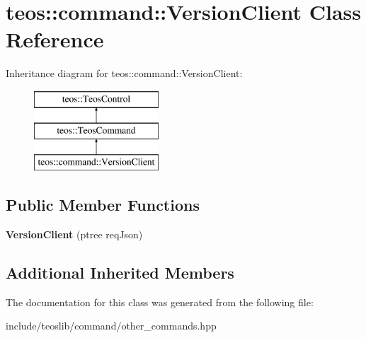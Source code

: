 \hypertarget{classteos_1_1command_1_1_version_client}{}\section{teos\+:\+:command\+:\+:Version\+Client Class Reference}
\label{classteos_1_1command_1_1_version_client}
Inheritance diagram for teos\+:\+:command\+:\+:Version\+Client\+:\begin{figure}[H]
\begin{center}
\leavevmode
\includegraphics[height=3.000000cm]{classteos_1_1command_1_1_version_client}
\end{center}
\end{figure}
\subsection*{Public Member Functions}
\begin{DoxyCompactItemize}
\item 
\mbox{\label{classteos_1_1command_1_1_version_client_a90072a3531e0e9064ff5933fea90807e}} 
{\bfseries Version\+Client} (ptree req\+Json)
\end{DoxyCompactItemize}
\subsection*{Additional Inherited Members}


The documentation for this class was generated from the following file\+:\begin{DoxyCompactItemize}
\item 
include/teoslib/command/other\+\_\+commands.\+hpp\end{DoxyCompactItemize}
